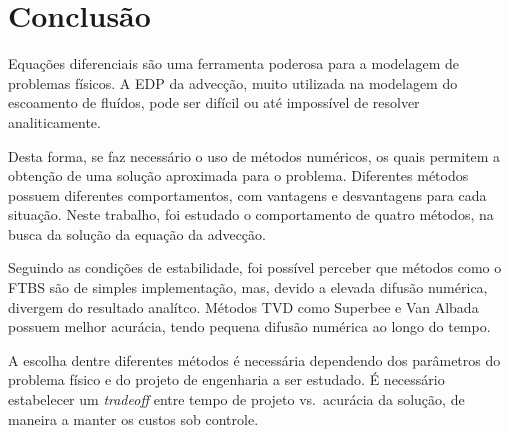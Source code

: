 \chapter{Conclusão}
Equações diferenciais são uma ferramenta poderosa para a modelagem de problemas
físicos. A EDP da advecção, muito utilizada na modelagem do escoamento de
fluídos, pode ser difícil ou até impossível de resolver analiticamente.

Desta forma, se faz necessário o uso de métodos numéricos, os quais permitem a
obtenção de uma solução aproximada para o problema. Diferentes métodos possuem
diferentes comportamentos, com vantagens e desvantagens para cada situação.
Neste trabalho, foi estudado o comportamento de quatro métodos, na busca da
solução da equação da advecção.

Seguindo as condições de estabilidade, foi possível perceber que métodos como o
FTBS são de simples implementação, mas, devido a elevada difusão numérica,
divergem do resultado analítco. Métodos TVD como Superbee e Van Albada possuem
melhor acurácia, tendo pequena difusão numérica ao longo do tempo.

A escolha dentre diferentes métodos é necessária dependendo dos parâmetros do
problema físico e do projeto de engenharia a ser estudado. É necessário
estabelecer um \textit{tradeoff} entre tempo de projeto vs.\ acurácia da
solução, de maneira a manter os custos sob controle.